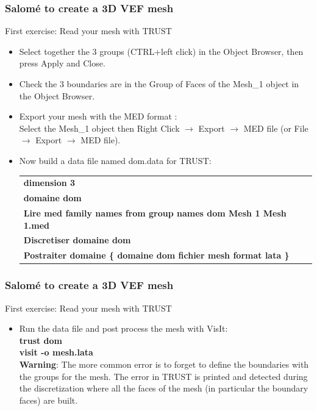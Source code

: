 \documentclass[10pt]{beamer}
\begin{document}
\begin{frame}
\frametitle{Salom\'e to create a 3D VEF mesh}
\begin{block}{First exercise:  Read your mesh with TRUST}

\begin{itemize}
\item Select together the 3 groups (CTRL+left click) in the Object Browser, then press Apply and Close.
\item Check the 3 boundaries are in the Group of Faces of the Mesh\_1 object in the Object Browser.
\item Export your mesh with the MED format :\\
Select the Mesh\_1 object then Right Click $\rightarrow$ Export $\rightarrow$ MED file (or File $\rightarrow$ Export $\rightarrow$ MED file).
\item Now build a data file named dom.data for TRUST:\\
\vspace{0.2cm}
\begin{tabular}{|l|}
\hline 
\textbf{dimension 3 }\tabularnewline
\textbf{domaine dom }\tabularnewline
\textbf{Lire med family names from group names dom Mesh 1 Mesh 1.med }\tabularnewline
\textbf{Discretiser domaine dom }\tabularnewline
\textbf{Postraiter domaine \{ domaine dom fichier mesh format lata\index{format lata}
\}}\tabularnewline
\hline 
\end{tabular}

\end{itemize}

\end{block}
\end{frame}
\begin{frame}
\frametitle{Salom\'e to create a 3D VEF mesh}
\begin{block}{First exercise: Read your mesh with TRUST}

\begin{itemize}
\item Run the data file and post process the mesh with VisIt:\\
\textbf{trust dom} \\
\textbf{visit -o mesh.lata} \\
\vspace{0.2cm}
\textbf{Warning}: The more common error is to forget to define the boundaries with the groups for the mesh. The error in TRUST is printed and detected during the discretization where all the faces of the mesh (in particular the boundary faces) are built.

\end{itemize}

\end{block}
\end{frame}
\end{document}
